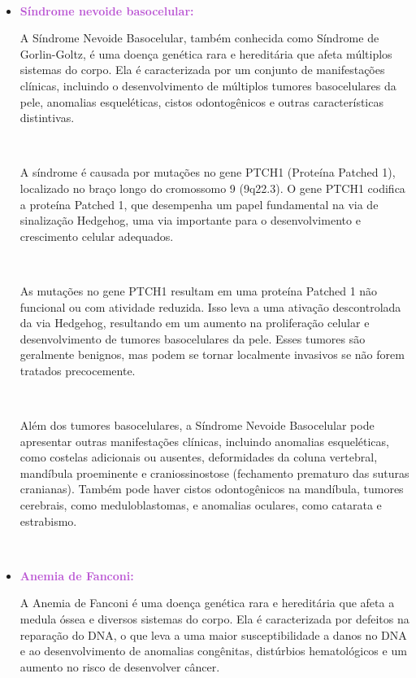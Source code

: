 \documentclass[11pt,a4paper]{article}
\begin{document}
\begin{itemize}[label=\textcolor{CarnationPink}{$\blacktriangleright$}]
		\

		\begin{itemize}[label=\textcolor{CarnationPink}{$\star$}]
			\item \textcolor{MediumOrchid}{\large\textbf{Síndrome nevoide basocelular:}} 
			
			A Síndrome Nevoide Basocelular, também conhecida como Síndrome de Gorlin-Goltz, é uma doença genética rara e hereditária que afeta múltiplos sistemas do corpo. Ela é caracterizada por um conjunto de manifestações clínicas, incluindo o desenvolvimento de múltiplos tumores basocelulares da pele, anomalias esqueléticas, cistos odontogênicos e outras características distintivas.

			\

			A síndrome é causada por mutações no gene PTCH1 (Proteína Patched 1), localizado no braço longo do cromossomo 9 (9q22.3). O gene PTCH1 codifica a proteína Patched 1, que desempenha um papel fundamental na via de sinalização Hedgehog, uma via importante para o desenvolvimento e crescimento celular adequados.

			\

			As mutações no gene PTCH1 resultam em uma proteína Patched 1 não funcional ou com atividade reduzida. Isso leva a uma ativação descontrolada da via Hedgehog, resultando em um aumento na proliferação celular e desenvolvimento de tumores basocelulares da pele. Esses tumores são geralmente benignos, mas podem se tornar localmente invasivos se não forem tratados precocemente.

			\

			Além dos tumores basocelulares, a Síndrome Nevoide Basocelular pode apresentar outras manifestações clínicas, incluindo anomalias esqueléticas, como costelas adicionais ou ausentes, deformidades da coluna vertebral, mandíbula proeminente e craniossinostose (fechamento prematuro das suturas cranianas). Também pode haver cistos odontogênicos na mandíbula, tumores cerebrais, como meduloblastomas, e anomalias oculares, como catarata e estrabismo.

			\

			\item \textcolor{MediumOrchid}{\large\textbf{Anemia de Fanconi:}}
			
			A Anemia de Fanconi é uma doença genética rara e hereditária que afeta a medula óssea e diversos sistemas do corpo. Ela é caracterizada por defeitos na reparação do DNA, o que leva a uma maior susceptibilidade a danos no DNA e ao desenvolvimento de anomalias congênitas, distúrbios hematológicos e um aumento no risco de desenvolver câncer.


\end{itemize}
\end{itemize}
\end{document}

